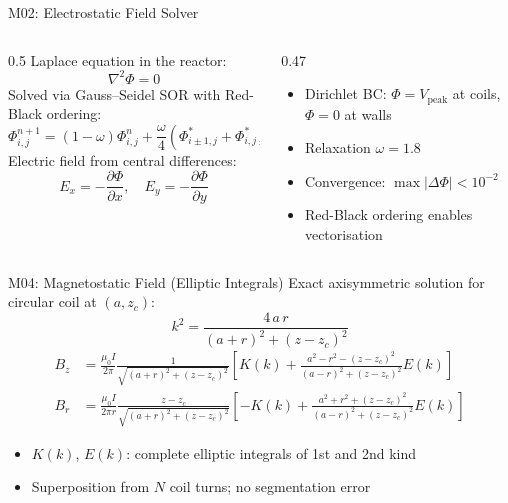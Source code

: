 \documentclass[aspectratio=169,10pt]{beamer}
\begin{document}
\begin{frame}{M02: Electrostatic Field Solver}
  \begin{columns}[T]
    \begin{column}{0.5\textwidth}
      Laplace equation in the reactor:
      \[
        \nabla^2 \Phi = 0
      \]
      Solved via Gauss--Seidel SOR with Red-Black ordering:
      \[
        \Phi_{i,j}^{n+1} = (1{-}\omega)\Phi_{i,j}^n + \frac{\omega}{4}
        \!\left(\Phi_{i\pm1,j}^{*} + \Phi_{i,j\pm1}^{*}\right)
      \]
      Electric field from central differences:
      \[
        E_x = -\frac{\partial\Phi}{\partial x},\quad
        E_y = -\frac{\partial\Phi}{\partial y}
      \]
    \end{column}
    \begin{column}{0.47\textwidth}
      \begin{itemize}[]
        \item Dirichlet BC: $\Phi = V_\text{peak}$ at coils, $\Phi = 0$ at walls
        \item Relaxation $\omega = 1.8$
        \item Convergence: $\max|\Delta\Phi| < 10^{-2}$
        \item Red-Black ordering enables vectorisation
      \end{itemize}
    \end{column}
  \end{columns}
\end{frame}

\begin{frame}{M04: Magnetostatic Field (Elliptic Integrals)}
  Exact axisymmetric solution for circular coil at $(a, z_c)$:
  \[
    k^2 = \frac{4\,a\,r}{(a+r)^2 + (z-z_c)^2}
  \]
  \begin{align}
    B_z &= \frac{\mu_0 I}{2\pi}\frac{1}{\sqrt{(a{+}r)^2{+}(z{-}z_c)^2}}
    \left[K(k) + \frac{a^2{-}r^2{-}(z{-}z_c)^2}{(a{-}r)^2{+}(z{-}z_c)^2}E(k)\right] \\
    B_r &= \frac{\mu_0 I}{2\pi r}\frac{z{-}z_c}{\sqrt{(a{+}r)^2{+}(z{-}z_c)^2}}
    \left[-K(k) + \frac{a^2{+}r^2{+}(z{-}z_c)^2}{(a{-}r)^2{+}(z{-}z_c)^2}E(k)\right]
  \end{align}
  \begin{itemize}[]
    \item $K(k)$, $E(k)$: complete elliptic integrals of 1st and 2nd kind
    \item Superposition from $N$ coil turns; no segmentation error
  \end{itemize}
\end{frame}
\end{document}
